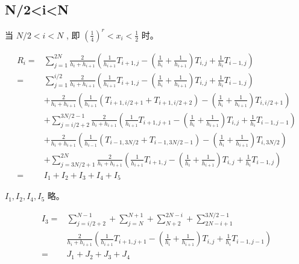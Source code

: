 \documentclass{ctexart}
\begin{document}
\subsection{N/2<i<N}

当 \(N/2<i<N\) , 即 \((\frac{1}{4})^r<x_i<\frac{1}{2}\) 时。


\begin{equation}
    \begin{aligned}
        R_i
        = & \sum_{j=1}^{2N} \frac{2}{h_i + h_{i+1}}
        \left( \frac{1}{h_{i+1}} T_{i+1, j}
        - (\frac{1}{h_{i}}+\frac{1}{h_{i+1}}) T_{i,j}
        +  \frac{1}{h_{i}} T_{i-1, j} \right)                     \\
        = & \sum_{j=1}^{i/2} \frac{2}{h_i + h_{i+1}}
        \left( \frac{1}{h_{i+1}} T_{i+1, j}
        - (\frac{1}{h_{i}}+\frac{1}{h_{i+1}}) T_{i,j}
        +  \frac{1}{h_{i}} T_{i-1, j} \right)                     \\
          & + \frac{2}{h_i + h_{i+1}}
        \left( \frac{1}{h_{i+1}} (T_{i+1, i/2+1} +  T_{i+1, i/2+2})
        - (\frac{1}{h_{i}}+\frac{1}{h_{i+1}}) T_{i,i/2+1} \right) \\
          & + \sum_{j=i/2+2}^{3N/2-1} \frac{2}{h_i + h_{i+1}}
        \left( \frac{1}{h_{i+1}} T_{i+1, j+1}
        - (\frac{1}{h_{i}}+\frac{1}{h_{i+1}}) T_{i,j}
        +  \frac{1}{h_{i}} T_{i-1, j-1} \right)                   \\
          & + \frac{2}{h_i + h_{i+1}}
        \left( \frac{1}{h_{i-1}} (T_{i-1, 3N/2} +  T_{i-1, 3N/2-1})
        - (\frac{1}{h_{i}}+\frac{1}{h_{i+1}}) T_{i,3N/2} \right)  \\
          & + \sum_{j=3N/2+1}^{2N} \frac{2}{h_i + h_{i+1}}
        \left( \frac{1}{h_{i+1}} T_{i+1, j}
        - (\frac{1}{h_{i}}+\frac{1}{h_{i+1}}) T_{i,j}
        +  \frac{1}{h_{i}} T_{i-1, j} \right)                     \\
        = & I_1 + I_2 + I_3 + I_4 + I_5
    \end{aligned}
\end{equation}

\(I_1, I_2, I_4, I_5\) 略。

\begin{equation}
    \begin{aligned}
        I_3 = & \sum_{j=i/2+2}^{N-1}  + \sum_{j=N}^{N+1} + \sum_{N+2}^{2N-i} + \sum_{2N-i+1}^{3N/2-1} \\
              & \frac{2}{h_i + h_{i+1}}
        \left( \frac{1}{h_{i+1}} T_{i+1, j+1}
        - (\frac{1}{h_{i}}+\frac{1}{h_{i+1}}) T_{i,j}
        +  \frac{1}{h_{i}} T_{i-1, j-1} \right)                                                       \\
        =     & J_1 + J_2 + J_3 + J_4
    \end{aligned}
\end{equation}
\end{document}
